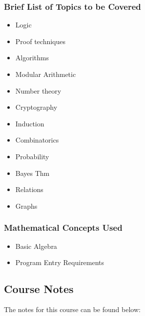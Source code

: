 {\begin{highlight}[\CSPBDisc]
        \subsubsection*{Brief List of Topics to be Covered}
    
        \begin{itemize}
            \item Logic
            \item Proof techniques
            \item Algorithms
            \item Modular Arithmetic
            \item Number theory
            \item Cryptography
            \item Induction
            \item Combinatorics
            \item Probability
            \item Bayes Thm
            \item Relations
            \item Graphs
        \end{itemize}
    
        \subsubsection*{Mathematical Concepts Used}
    
        \begin{itemize}
            \item Basic Algebra
            \item Program Entry Requirements
        \end{itemize}
    \end{highlight}
}

\subsection{Course Notes}

The notes for this course can be found below: \coursedoc{\CSPBDiscreteCourseNotes}




